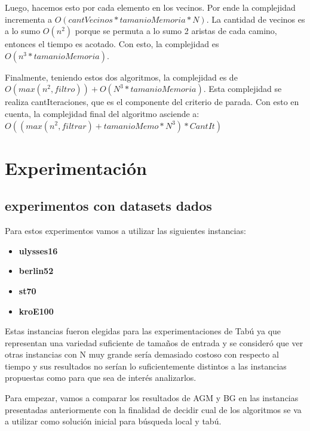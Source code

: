 \documentclass[10pt,a4paper]{article}
\begin{document}
Luego, hacemos esto por cada elemento en los vecinos. Por ende la complejidad incrementa a $O(cantVecinos*tamanioMemoria*N)$.
La cantidad de vecinos es a lo sumo $O(n^2)$ porque se permuta a lo sumo 2 aristas de cada camino, entonces el tiempo es acotado. Con esto, la complejidad es $O(n^3 * tamanioMemoria)$.

Finalmente, teniendo estos dos algoritmos, la complejidad es de $O(max(n^2, filtro)) + O(N^3*tamanioMemoria)$.
Esta complejidad se realiza cantIteraciones, que es el componente del criterio de parada.
Con esto en cuenta, la complejidad final del algoritmo asciende a: $O((max(n^2,filtrar)+tamanioMemo*N^3)*CantIt)$

\section{Experimentación}

\subsection{experimentos con datasets dados}
Para estos experimentos vamos a utilizar las siguientes instancias:
\begin{itemize}
\setlength{\itemsep}{1pt}
\setlength{\parskip}{0pt}
 \setlength{\parsep}{0pt}

\item \textbf{ulysses16}   
\item \textbf{berlin52}
\item \textbf{st70}
\item \textbf{kroE100}

\end{itemize}

Estas instancias fueron elegidas para las experimentaciones de Tabú ya que representan una variedad suficiente de tamaños de entrada y se consideró que ver otras instancias con N muy grande sería demasiado costoso con respecto al tiempo y sus resultados no serían lo suficientemente distintos a las instancias propuestas como para que sea de interés analizarlos. 

Para empezar, vamos a comparar los resultados de AGM y BG en las instancias presentadas anteriormente con la finalidad de decidir cual de los algoritmos se va a utilizar como solución inicial para búsqueda local y tabú.
\end{document}
